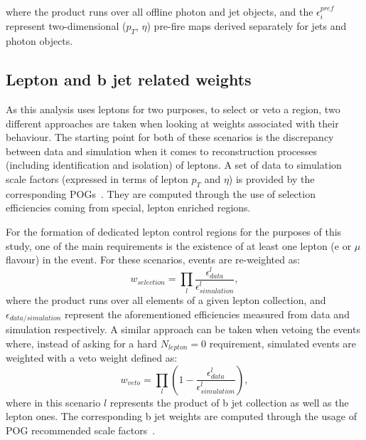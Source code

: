 where the product runs over all offline photon and jet objects, and the $\epsilon_i^{pref}$ represent two-dimensional ($p_T$, $\eta$) pre-fire maps derived separately for jets and photon objects.

\subsection{Lepton and b jet related weights}
\hspace{10pt} As this analysis uses leptons for two purposes, to select or veto a region, two different approaches are taken when looking at weights associated with their behaviour. The starting point for both of these scenarios is the discrepancy between data and simulation when it comes to reconstruction processes (including identification and isolation) of leptons. A set of data to simulation scale factors (expressed in terms of lepton $p_T$ and $\eta$) is provided by the corresponding POGs~\cite{twiki_electron_sfs, twiki_muon_sfs, twiki_tau_pog}. They are computed through the use of selection efficiencies coming from special, lepton enriched regions. 

\hspace{10pt} For the formation of dedicated lepton control regions for the purposes of this study, one of the main requirements is the existence of at least one lepton (e or $\mu$ flavour) in the event. For these scenarios, events are re-weighted as:
\begin{equation}
    w_{selection} = \prod_l \frac{\epsilon^{l}_{data}}{\epsilon^{l}_{simulation}},
    \label{eq:sel_weight}
\end{equation}
where the product runs over all elements of a given lepton collection, and $\epsilon_{data/simulation}$ represent the aforementioned efficiencies measured from data and simulation respectively. A similar approach can be taken when vetoing the events where, instead of asking for a hard $N_{lepton}=0$ requirement, simulated events are weighted with a veto weight defined as:
\begin{equation}
    w_{veto} = \prod_l \left (1-\frac{\epsilon^{l}_{data}}{\epsilon^{l}_{simulation}}\right),
    \label{eq:veto_weight}
\end{equation}
where in this scenario $l$ represents the product of b jet collection as well as the lepton ones. The corresponding b jet weights are computed through the usage of POG recommended scale factors~\cite{twiki_bjets_methods}.

